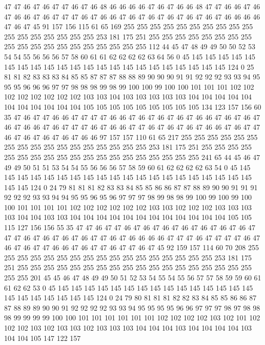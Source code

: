 47 47 46 47 46 47 47 46 47 46 48 46 46 46 46 47 46 47 46 46
48 47 47 46 46 47 46 47 46 46 47 46 47 47 47 46 47 46 46 47
46 47 46 47 46 47 46 47 46 47 46 46 46 46 47 46 47 45 91 157
156 115 61 65 169 255 255 255 255 255 255 255 255 255 255 255 255 255 255 255
255 255 253 181 175 251 255 255 255 255 255 255 255 255 255 255 255 255 255 255
255 255 255 255 255 112 44 45 47 48 49 49 50 50 52 53 54 54 55 56
56 56 57 58 60 61 61 62 62 62 62 63 64 56 0 45 145 145 145 145
145 145 145 145 145 145 145 145 145 145 145 145 145 145 145 145 145 145 124 0
25 81 81 82 83 83 83 84 85 85 87 87 87 88 88 89 90 90 90 91
91 92 92 92 93 93 94 95 95 95 96 96 96 97 97 98 98 98 99 98
99 100 100 99 100 100 101 101 101 102 102 102 102 102 102 102 102 103 103 104
103 103 103 103 103 104 104 104 104 104 104 104 104 104 104 104 105 105 105 105
105 105 105 105 105 134 123 157 156 60 35 47 46 47 47 46 46 47 47 47
47 46 46 47 46 47 46 47 46 47 46 46 47 46 47 46 47 46 47 46
46 47 46 47 47 47 46 47 46 46 47 47 46 47 46 47 46 47 46 46
47 46 47 47 46 47 46 47 46 47 46 47 46 46 97 157 157 110 61 65
217 255 255 255 255 255 255 255 255 255 255 255 255 255 255 255 255 255 253 181
175 251 255 255 255 255 255 255 255 255 255 255 255 255 255 255 255 255 255 255
255 241 65 44 45 46 47 49 49 50 51 51 53 54 54 55 56 56 56 57
58 59 60 61 62 62 62 62 63 54 0 45 145 145 145 145 145 145 145 145
145 145 145 145 145 145 145 145 145 145 145 145 145 145 124 0 24 79 81 81
81 82 83 83 84 85 85 86 86 87 87 88 89 90 90 91 91 91 92 92
92 93 93 94 94 95 95 96 95 96 97 97 97 98 99 98 98 99 100 99
100 99 100 100 101 101 101 101 102 102 102 102 102 102 103 103 102 102 102 103
103 103 103 104 104 103 103 104 104 104 104 104 104 104 104 104 104 104 104 105
105 115 127 156 156 55 35 47 47 46 47 47 46 47 46 47 46 47 46 47
46 47 46 47 46 47 47 47 46 47 46 47 46 47 46 47 47 46 47 46
46 46 46 47 47 47 46 47 47 47 47 46 47 46 47 46 47 47 46 46
47 46 47 47 46 47 47 46 47 45 92 159 157 114 60 70 208 255 255 255
255 255 255 255 255 255 255 255 255 255 255 255 255 255 253 181 175 251 255 255
255 255 255 255 255 255 255 255 255 255 255 255 255 255 255 255 255 255 201 45
45 46 47 48 49 49 50 51 52 53 54 55 54 55 56 57 57 58 59 59
60 61 61 62 62 53 0 45 145 145 145 145 145 145 145 145 145 145 145 145
145 145 145 145 145 145 145 145 145 145 124 0 24 79 80 81 81 81 82 82
83 84 85 85 86 86 87 87 88 89 89 90 90 91 92 92 92 92 93 93
94 95 95 95 95 96 96 97 97 97 98 97 98 98 98 99 99 99 99 100
100 101 101 101 101 101 101 102 102 102 102 103 102 101 102 102 102 103 102 103
103 102 103 103 103 104 104 104 103 104 104 104 104 103 104 104 105 147 122 157
